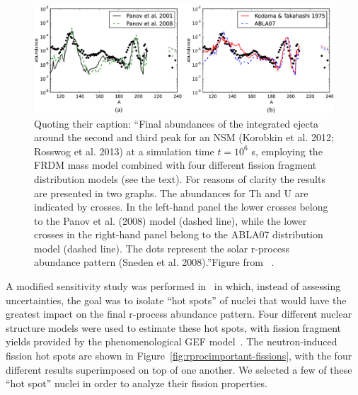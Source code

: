 \begin{figure}
	\centering
	\includegraphics[width=0.9\linewidth]{TeX_files/rProc_abundances}
	\caption[Final r-process abundances for a neutron star merger scenario with different fission fragment distributions.]{Quoting their caption: ``Final abundances of the integrated ejecta around the second and third peak for an NSM (Korobkin et al. 2012; Rosswog et al. 2013) at a simulation time $t={10}^{6}$ s, employing the FRDM mass model combined with four different fission fragment distribution models (see the text). For reasons of clarity the results are presented in two graphs. The abundances for Th and U are indicated by crosses. In the left-hand panel the lower crosses belong to the Panov et al. (2008) model (dashed line), while the lower crosses in the right-hand panel belong to the ABLA07 distribution model (dashed line). The dots represent the solar r-process abundance pattern (Sneden et al. 2008).''Figure from ~\cite{Eichler2015}.}
	\label{fig:rprocabundances}
\end{figure}

A modified sensitivity study was performed in~\cite{Vassh2019} in which, instead of assessing uncertainties, the goal was to isolate ``hot spots'' of nuclei that would have the greatest impact on the final r-process abundance pattern. Four different nuclear structure models were used to estimate these hot spots, with fission fragment yields provided by the phenomenological GEF model~\cite{Schmidt2016}. The neutron-induced fission hot spots are shown in Figure~\ref{fig:rprocimportant-fissions}, with the four different results superimposed on top of one another. We selected a few of these ``hot spot'' nuclei in order to analyze their fission properties.

